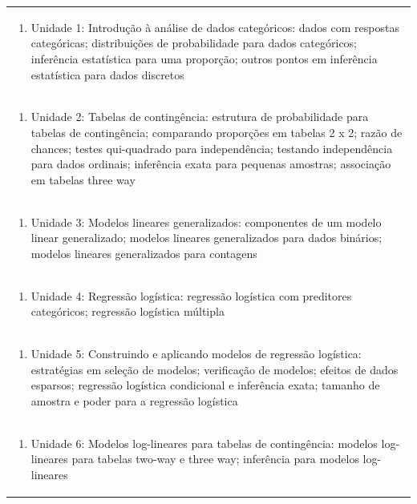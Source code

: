 \documentclass[11pt]{article}
\begin{document}
\begin{center}
\begin{longtable}{|p{4cm}|p{4cm}|p{4cm}|p{4cm}|}
\multicolumn{4}{|p{\dimexpr 16cm + 6\tabcolsep\relax}|}{\begin{enumerate}[start=1]\item Unidade 1: Introdução à análise de dados categóricos: dados com respostas categóricas; distribuições de probabilidade para dados categóricos; inferência estatística para uma proporção; outros pontos em inferência estatística para dados discretos\end{enumerate}}\\
\multicolumn{4}{|p{\dimexpr 16cm + 6\tabcolsep\relax}|}{\begin{enumerate}[start=2]\item Unidade 2: Tabelas de contingência: estrutura de probabilidade para tabelas de contingência; comparando proporções em tabelas 2 x 2; razão de chances; testes qui-quadrado para independência; testando independência para dados ordinais; inferência exata para pequenas amostras; associação em tabelas three way\end{enumerate}}\\
\multicolumn{4}{|p{\dimexpr 16cm + 6\tabcolsep\relax}|}{\begin{enumerate}[start=3]\item Unidade 3: Modelos lineares generalizados: componentes de um modelo linear generalizado; modelos lineares generalizados para dados binários; modelos lineares generalizados para contagens\end{enumerate}}\\
\multicolumn{4}{|p{\dimexpr 16cm + 6\tabcolsep\relax}|}{\begin{enumerate}[start=4]\item Unidade 4: Regressão logística: regressão logística com preditores categóricos; regressão logística múltipla\end{enumerate}}\\
\multicolumn{4}{|p{\dimexpr 16cm + 6\tabcolsep\relax}|}{\begin{enumerate}[start=5]\item Unidade 5: Construindo e aplicando modelos de regressão logística: estratégias em seleção de modelos; verificação de modelos; efeitos de dados esparsos; regressão logística condicional e inferência exata; tamanho de amostra e poder para a regressão logística\end{enumerate}}\\
\multicolumn{4}{|p{\dimexpr 16cm + 6\tabcolsep\relax}|}{\begin{enumerate}[start=6]\item Unidade 6: Modelos log-lineares para tabelas de contingência: modelos log-lineares para tabelas two-way e three way; inferência para modelos log-lineares\end{enumerate}}\\

\end{longtable}
\end{center}
\end{document}
